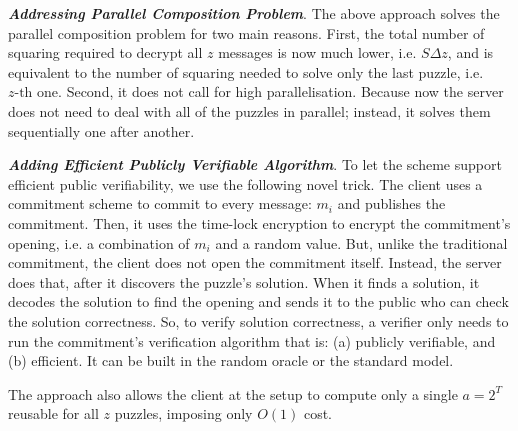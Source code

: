   
  
  \noindent\textit{\textbf{Addressing Parallel Composition Problem}}.  The above approach solves the parallel composition problem for two main reasons.  First, the total  number of squaring required to decrypt all $z$ messages is now much lower, i.e. $S \Delta z$, and is equivalent to the number of squaring needed to solve only the last puzzle,  i.e. $z\text{-th}$ one. Second, it does not call for  high parallelisation. Because now the server does not need to deal with all of the puzzles in parallel; instead, it solves them sequentially one after another.  
  
  
  
  \noindent\textit{\textbf{Adding Efficient Publicly Verifiable Algorithm}}. To let the  scheme  support  efficient public verifiability, we use the following novel trick. The client uses a commitment scheme to commit to every message: $m_{\scriptscriptstyle i}$ and publishes the  commitment. Then, it uses the time-lock encryption to encrypt the commitment's opening, i.e. a combination of $m_{\scriptscriptstyle i}$ and a random value. But, unlike the traditional commitment, the client does not open the commitment itself. Instead, the server does that, after it discovers the puzzle's solution.  When it finds a solution, it decodes the solution to find the opening and sends it to the public who can check the solution correctness. So, to verify  solution correctness,   a verifier  only needs to run the commitment's verification algorithm that is: (a)  publicly verifiable, and (b)   efficient. It can be built in the random oracle  or  the standard model.
  
    The approach also allows  the client at the setup to compute only a single $a=2^{\scriptscriptstyle T}$  reusable for all $z$ puzzles, imposing only $O(1)$  cost. 



